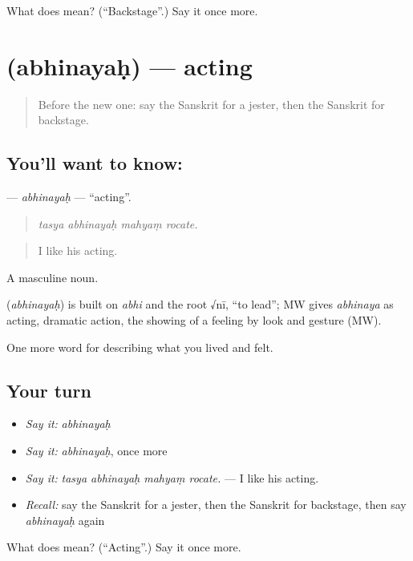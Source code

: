 \begin{tcolorbox}[breakable,colback=teal!4,colframe=teal!35!black,title={Before you move on}]
What does  mean? (\textquotedblleft{}Backstage\textquotedblright{}.) Say it once more.
\end{tcolorbox}
\section[\texorpdfstring{\sk{अभिनयः} (abhinayaḥ)}{अभिनयः (abhinayaḥ)}]{ (abhinayaḥ) — acting}

\label{lesson:SA-C523-abhinayah}



\begin{quote}
Before the new one: say the Sanskrit for a jester, then the Sanskrit for backstage.
\end{quote}

\subsection*{You'll want to know: }
\textbf{} — \emph{abhinayaḥ} — \textquotedblleft{}acting\textquotedblright{}.

\begin{quote}
   
\end{quote}

\begin{quote}
\emph{tasya abhinayaḥ mahyaṃ rocate.}
\end{quote}

\begin{quote}
I like his acting.
\end{quote}

A masculine noun.

\begin{cousinweb}
\textbf{} (\emph{abhinayaḥ}) is built on \emph{abhi} and the root √nī, \textquotedblleft{}to lead\textquotedblright{}; MW gives \emph{abhinaya} as acting, dramatic action, the showing of a feeling by look and gesture (MW).
\end{cousinweb}

\begin{grammarlens}[title={What you've built}]
One more word for describing what you lived and felt.
\end{grammarlens}

\subsection*{Your turn}
\begin{itemize}
\raggedright
  \item \emph{Say it:} \emph{abhinayaḥ}
  \item \emph{Say it:} \emph{abhinayaḥ}, once more
  \item \emph{Say it:} \emph{tasya abhinayaḥ mahyaṃ rocate.} — I like his acting.
  \item \emph{Recall:} say the Sanskrit for a jester, then the Sanskrit for backstage, then say \emph{abhinayaḥ} again
\end{itemize}

\begin{tcolorbox}[breakable,colback=teal!4,colframe=teal!35!black,title={Before you move on}]
What does  mean? (\textquotedblleft{}Acting\textquotedblright{}.) Say it once more.
\end{tcolorbox}
